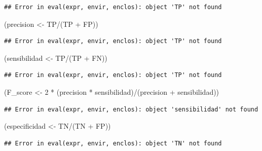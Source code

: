 \documentclass[
  12pt,
]{book}
\newenvironment{Shaded}{\begin{snugshade}}{\end{snugshade}}
\newcommand{\DecValTok}[1]{\textcolor[rgb]{0.00,0.00,0.81}{#1}}
\newcommand{\NormalTok}[1]{#1}
\newcommand{\OtherTok}[1]{\textcolor[rgb]{0.56,0.35,0.01}{#1}}
\newcommand{\SpecialCharTok}[1]{\textcolor[rgb]{0.00,0.00,0.00}{#1}}
\theoremstyle{definition}
\theoremstyle{definition}
\theoremstyle{definition}
\theoremstyle{definition}
\theoremstyle{remark}
\begin{document}
\begin{verbatim}
## Error in eval(expr, envir, enclos): object 'TP' not found
\end{verbatim}

\begin{Shaded}
\begin{Highlighting}[]
\NormalTok{(precision }\OtherTok{\textless{}{-}}\NormalTok{ TP}\SpecialCharTok{/}\NormalTok{(TP }\SpecialCharTok{+}\NormalTok{ FP))}
\end{Highlighting}
\end{Shaded}

\begin{verbatim}
## Error in eval(expr, envir, enclos): object 'TP' not found
\end{verbatim}

\begin{Shaded}
\begin{Highlighting}[]
\NormalTok{(sensibilidad }\OtherTok{\textless{}{-}}\NormalTok{ TP}\SpecialCharTok{/}\NormalTok{(TP }\SpecialCharTok{+}\NormalTok{ FN))}
\end{Highlighting}
\end{Shaded}

\begin{verbatim}
## Error in eval(expr, envir, enclos): object 'TP' not found
\end{verbatim}

\begin{Shaded}
\begin{Highlighting}[]
\NormalTok{(F\_score }\OtherTok{\textless{}{-}} \DecValTok{2} \SpecialCharTok{*}\NormalTok{ (precision }\SpecialCharTok{*}\NormalTok{ sensibilidad)}\SpecialCharTok{/}\NormalTok{(precision }\SpecialCharTok{+}
\NormalTok{    sensibilidad))}
\end{Highlighting}
\end{Shaded}

\begin{verbatim}
## Error in eval(expr, envir, enclos): object 'sensibilidad' not found
\end{verbatim}

\begin{Shaded}
\begin{Highlighting}[]
\NormalTok{(especificidad }\OtherTok{\textless{}{-}}\NormalTok{ TN}\SpecialCharTok{/}\NormalTok{(TN }\SpecialCharTok{+}\NormalTok{ FP))}
\end{Highlighting}
\end{Shaded}

\begin{verbatim}
## Error in eval(expr, envir, enclos): object 'TN' not found
\end{verbatim}
\end{document}
